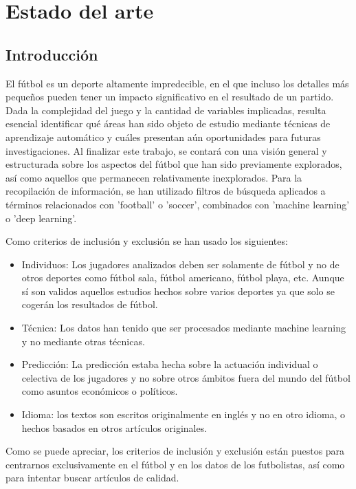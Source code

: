 \chapter{Estado del arte}

\section{Introducción}

El fútbol es un deporte altamente impredecible, en el que incluso los detalles más pequeños pueden tener un impacto significativo en el resultado de un partido. Dada la complejidad del juego y la cantidad de variables implicadas, resulta esencial identificar qué áreas han sido objeto de estudio mediante técnicas de aprendizaje automático y cuáles presentan aún oportunidades para futuras investigaciones. Al finalizar este trabajo, se contará con una visión general y estructurada sobre los aspectos del fútbol que han sido previamente explorados, así como aquellos que permanecen relativamente inexplorados. Para la recopilación de información, se han utilizado filtros de búsqueda aplicados a términos relacionados con 'football' o 'soccer', combinados con 'machine learning' o 'deep learning'.

Como criterios de inclusión y exclusión se han usado los siguientes:
\begin{itemize}
    \item Individuos: Los jugadores analizados deben ser solamente de fútbol y no de otros deportes como fútbol sala, fútbol americano, fútbol playa, etc. Aunque sí son validos aquellos estudios hechos sobre varios deportes ya que solo se cogerán los resultados de fútbol.
    \item Técnica: Los datos han tenido que ser procesados mediante machine learning y no mediante otras técnicas.
    \item Predicción: La predicción estaba hecha sobre la actuación individual o celectiva de los jugadores y no sobre otros ámbitos fuera del mundo del fútbol como asuntos económicos o políticos.
    \item Idioma: los textos son escritos originalmente en inglés y no en otro idioma, o hechos basados en otros artículos originales.

\end{itemize}

Como se puede apreciar, los criterios de inclusión y exclusión están puestos para centrarnos exclusivamente en el fútbol y en los datos de los futbolistas, así como para intentar buscar artículos de calidad.

